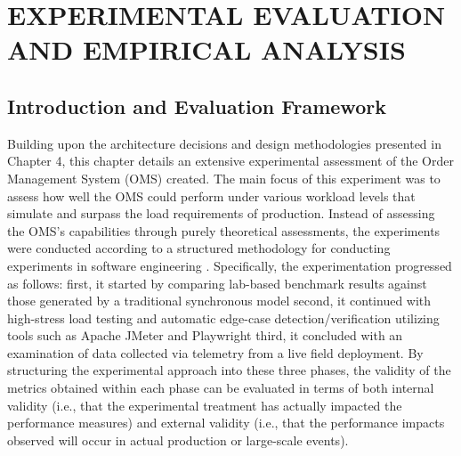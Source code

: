 \chapter{EXPERIMENTAL EVALUATION AND EMPIRICAL ANALYSIS}
\label{ch:evaluation}

\section{Introduction and Evaluation Framework}
Building upon the architecture decisions and design methodologies presented in Chapter 4, this chapter details an extensive experimental assessment of the Order Management System (OMS) created. The main focus of this experiment was to assess how well the OMS could perform under various workload levels that simulate and surpass the load requirements of production. Instead of assessing the OMS's capabilities through purely theoretical assessments, the experiments were conducted according to a structured methodology for conducting experiments in software engineering \cite{wohlin2012threats}. Specifically, the experimentation progressed as follows: first, it started by comparing lab-based benchmark results against those generated by a traditional synchronous model second, it continued with high-stress load testing and automatic edge-case detection/verification utilizing tools such as Apache JMeter \cite{jmeter2024} and Playwright \cite{playwright2024} third, it concluded with an examination of data collected via telemetry from a live field deployment. By structuring the experimental approach into these three phases, the validity of the metrics obtained within each phase can be evaluated in terms of both internal validity (i.e., that the experimental treatment has actually impacted the performance measures) and external validity (i.e., that the performance impacts observed will occur in actual production or large-scale events).
